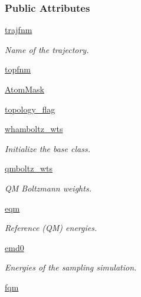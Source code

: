 \subsubsection*{Public Attributes}
\begin{DoxyCompactItemize}
\item 
\hyperlink{classforcebalance_1_1gmxio_1_1AbInitio__GMX_a783aa140f687d16afebd640a3fa492dd}{trajfnm}
\begin{DoxyCompactList}\small\item\em Name of the trajectory. \end{DoxyCompactList}\item 
\hyperlink{classforcebalance_1_1gmxio_1_1AbInitio__GMX_a885b702e86cd8978df92fbdac8dd36e9}{topfnm}
\item 
\hyperlink{classforcebalance_1_1gmxio_1_1AbInitio__GMX_a1ba04a104c0a2e1bafdf3281c95bac72}{Atom\-Mask}
\item 
\hyperlink{classforcebalance_1_1gmxio_1_1AbInitio__GMX_a4ad28e81af854bc33e671224c5f26fca}{topology\-\_\-flag}
\item 
\hyperlink{classforcebalance_1_1abinitio_1_1AbInitio_a885e7ef58b9e7c6abbc24321e5f3c61a}{whamboltz\-\_\-wts}
\begin{DoxyCompactList}\small\item\em Initialize the base class. \end{DoxyCompactList}\item 
\hyperlink{classforcebalance_1_1abinitio_1_1AbInitio_a06ec6b12d81791ca94f599f41e56335a}{qmboltz\-\_\-wts}
\begin{DoxyCompactList}\small\item\em Q\-M Boltzmann weights. \end{DoxyCompactList}\item 
\hyperlink{classforcebalance_1_1abinitio_1_1AbInitio_a64387fae9bdfb0d03ca6961e67c779be}{eqm}
\begin{DoxyCompactList}\small\item\em Reference (Q\-M) energies. \end{DoxyCompactList}\item 
\hyperlink{classforcebalance_1_1abinitio_1_1AbInitio_af928d333d14cb3b93f7db78530455873}{emd0}
\begin{DoxyCompactList}\small\item\em Energies of the sampling simulation. \end{DoxyCompactList}\item 
\hyperlink{classforcebalance_1_1abinitio_1_1AbInitio_af025be2ce97da3e8dc876d70e403f4ef}{fqm}

\end{DoxyCompactItemize}
